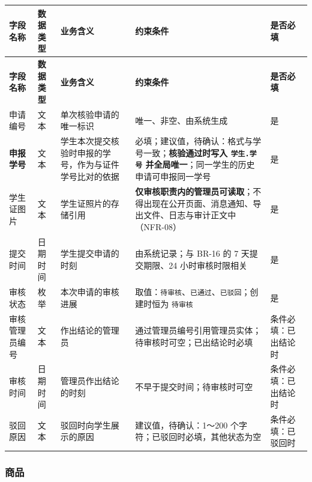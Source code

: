 \documentclass[12pt,a4paper]{ctexart}
\begin{document}
{\scriptsize
\begin{longtable}{|p{1.57cm}|p{1.51cm}|p{4.14cm}|p{6.77cm}|p{2.02cm}|}
\hline
\textbf{字段名称} & \textbf{数据类型} & \textbf{业务含义} & \textbf{约束条件} & \textbf{是否必填} \\
\hline
\endfirsthead
\hline
\textbf{字段名称} & \textbf{数据类型} & \textbf{业务含义} & \textbf{约束条件} & \textbf{是否必填} \\
\hline
\endhead
\hline
\endfoot
申请编号 & 文本 & 单次核验申请的唯一标识 & 唯一、非空、由系统生成 & 是 \\
\hline
\textbf{申报学号} & 文本 & 学生本次提交核验时申报的学号，作为与证件学号比对的依据 & 必填；建议值，待确认：格式与学号一致；\textbf{核验通过时写入 \texttt{学生.学号} 并全局唯一}；同一学生的历史申请可申报同一学号 & 是 \\
\hline
学生证图片 & 文本 & 学生证照片的存储引用 & \textbf{仅审核职责内的管理员可读取}；不得出现在公开页面、消息通知、导出文件、日志与审计正文中（NFR-08） & 是 \\
\hline
提交时间 & 日期时间 & 学生提交申请的时刻 & 由系统记录；与 BR-16 的 7 天提交期限、24 小时审核时限相关 & 是 \\
\hline
审核状态 & 枚举 & 本次申请的审核进展 & 取值：\texttt{待审核}、\texttt{已通过}、\texttt{已驳回}；创建时恒为 \texttt{待审核} & 是 \\
\hline
审核管理员编号 & 文本 & 作出结论的管理员 & 通过管理员编号引用管理员实体；待审核时可空；已出结论时必填 & 条件必填：已出结论时 \\
\hline
审核时间 & 日期时间 & 管理员作出结论的时刻 & 不早于提交时间；待审核时可空 & 条件必填：已出结论时 \\
\hline
驳回原因 & 文本 & 驳回时向学生展示的原因 & 建议值，待确认：1～200 个字符；已驳回时必填，其他状态为空 & 条件必填：已驳回时 \\
\hline
\end{longtable}
}


\subsubsection*{商品}
\end{document}
